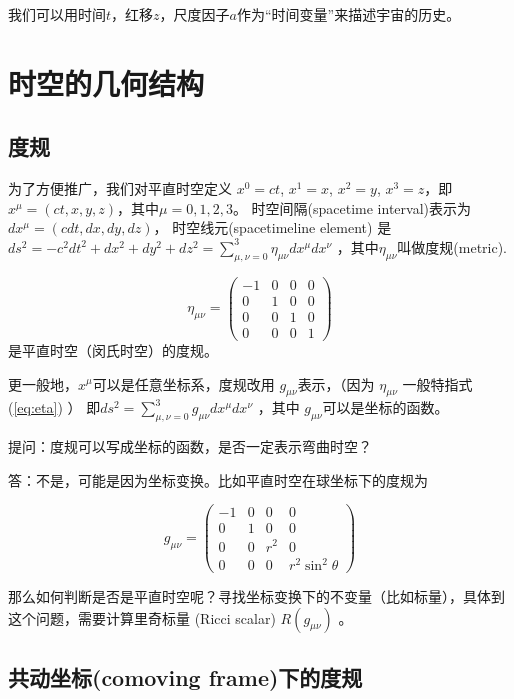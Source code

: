 \documentclass[]{ctexart}
\begin{document}
我们可以用时间$t$，红移$z$，尺度因子$a$作为“时间变量”来描述宇宙的历史。

\section{时空的几何结构}
\subsection{度规}
为了方便推广，我们对平直时空定义 $x^0=ct$, $x^1 = x$, $x^2=y$, $x^3=z$，即$x^\mu=(ct,x,y,z)$，其中$\mu = 0,1,2,3$。
时空间隔(spacetime interval)表示为 $dx^\mu=(cdt,dx,dy,dz)$，
时空线元(spacetimeline element) 是$ds^2=-c^2dt^2 + dx^2 + dy^2 + dz^2=\sum_{\mu,\nu=0}^3 \eta_{\mu \nu}dx^\mu dx^\nu$ ，其中$\eta_{\mu\nu}$叫做度规(metric).

\begin{equation} \label{eq:eta}
    \eta_{\mu\nu} = \left(\begin{array}{llll}-1 & 0 & 0 & 0 \\ 0 & 1 & 0 & 0 \\ 0& 0& 1 &0 \\ 0 & 0&0&1\end{array}\right)
\end{equation}
是平直时空（闵氏时空）的度规。

更一般地，$x^\mu$可以是任意坐标系，度规改用  $g_{\mu \nu}$表示，（因为 $\eta_{\mu\nu}$ 一般特指式(\ref{eq:eta}) ）
即$ds^2=\sum_{\mu,\nu=0}^3g_{\mu \nu}dx^\mu dx^\nu$ ，其中 $g_{\mu \nu}$可以是坐标的函数。 

提问：度规可以写成坐标的函数，是否一定表示弯曲时空？
\par 答：不是，可能是因为坐标变换。比如平直时空在球坐标下的度规为

$$g_{\mu\nu} = \left(\begin{array}{llll}-1 & 0 & 0 & 0 \\ 0 & 1 & 0 & 0 \\ 0& 0& r^2 &0 \\ 0 & 0&0& r^2 \sin^2 \theta\end{array}\right)$$

那么如何判断是否是平直时空呢？寻找坐标变换下的不变量（比如标量），具体到这个问题，需要计算里奇标量 (Ricci scalar) $R(g_{\mu\nu})$ 。

\subsection{共动坐标(comoving frame)下的度规}
\end{document}
